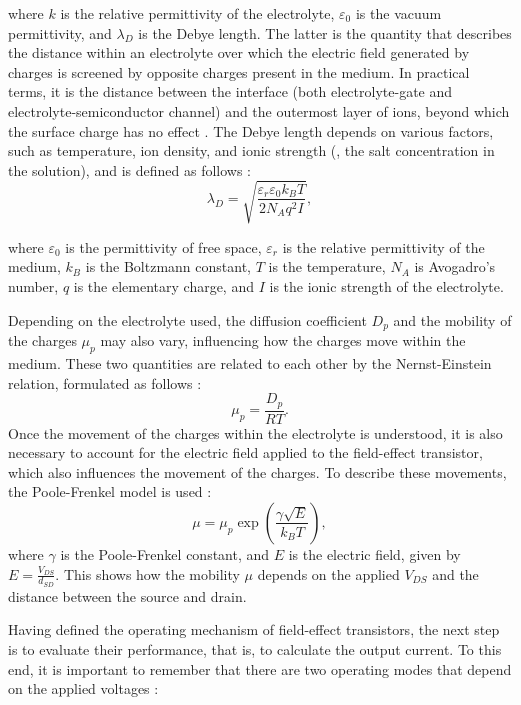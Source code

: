 where $k$ is the relative permittivity of the electrolyte, $\varepsilon_0$ is the vacuum permittivity, and $\lambda_D$ is the Debye length. The latter is the quantity that describes the distance within an electrolyte over which the electric field generated by charges is screened by opposite charges present in the medium. In practical terms, it is the distance between the interface (both electrolyte-gate and electrolyte-semiconductor channel) and the outermost layer of ions, beyond which the surface charge has no effect \citep{nakatsukaAptamer2018}. The Debye length depends on various factors, such as temperature, ion density, and ionic strength (\ie{}, the salt concentration in the solution), and is defined as follows \citep{shkodraElectrolytegated2021}:
\begin{equation}
    \lambda_D = \sqrt{\dfrac{\varepsilon_r \varepsilon_0 k_B T}{2N_Aq^2I}},
\end{equation}

where $\varepsilon_0$ is the permittivity of free space, $\varepsilon_r$ is the relative permittivity of the medium, $k_B$ is the Boltzmann constant, $T$ is the temperature, $N_A$ is Avogadro's number, $q$ is the elementary charge, and $I$ is the ionic strength of the electrolyte.

Depending on the electrolyte used, the diffusion coefficient $D_p$ and the mobility of the charges $\mu_p$ may also vary, influencing how the charges move within the medium. These two quantities are related to each other by the Nernst-Einstein relation, formulated as follows \citep{delavariNernst2021}:
%
\begin{equation}
    \mu_p = \dfrac{D_p}{RT}.
\end{equation}
%
Once the movement of the charges within the electrolyte is understood, it is also necessary to account for the electric field applied to the field-effect transistor, which also influences the movement of the charges. To describe these movements, the Poole-Frenkel model is used \citep{gillDrift1972,delavariNernst2021}:
%
\begin{equation}
    \mu = \mu_p\exp\left(\dfrac{\gamma \sqrt{E}}{k_BT}\right),
\end{equation}
%
where $\gamma$ is the Poole-Frenkel constant, and $E$ is the electric field, given by $E = \frac{V_{DS}}{d_{SD}}$. This shows how the mobility $\mu$ depends on the applied $V_{DS}$ and the distance between the source and drain.

Having defined the operating mechanism of field-effect transistors, the next step is to evaluate their performance, that is, to calculate the output current. To this end, it is important to remember that there are two operating modes that depend on the applied voltages \citep{shkodraElectrolytegated2021}:

